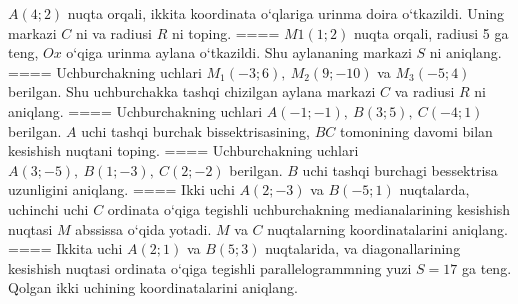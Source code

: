 \(A (4;2) \) nuqta orqali, ikkita koordinata o‘qlariga
urinma doira o‘tkazildi. Uning markazi $C$ ni va radiusi
$R$ ni toping.
====
\(M{1} (1; 2) \) nuqta orqali, radiusi 5 ga teng,
$Ox$ o‘qiga urinma aylana o‘tkazildi. Shu aylananing markazi
$S$ ni aniqlang.
====
Uchburchakning uchlari \(M_{1} (- 3;6),\ M_{2} (9; - 10) \)
va \(M_{3} (-5;4) \) berilgan. Shu uchburchakka tashqi chizilgan
aylana markazi $C$ va radiusi $R$ ni aniqlang.
====
Uchburchakning uchlari
\(A (- 1; - 1),\ B (3;5),\ C (- 4;1) \) berilgan. $A$ uchi tashqi
burchak bissektrisasining, $BC$ tomonining davomi bilan kesishish
nuqtani toping.
====
Uchburchakning uchlari
\(A (3; - 5),\ B (1; - 3),\ C (2; - 2) \) berilgan. $B$ uchi tashqi
burchagi bessektrisa uzunligini aniqlang.
====
Ikki uchi \(A (2; - 3) \) va \(B (-5;1) \) nuqtalarda,
uchinchi uchi $C$ ordinata o‘qiga tegishli uchburchakning
medianalarining kesishish nuqtasi $M$ abssissa o‘qida yotadi.
$M$ va $C$ nuqtalarning koordinatalarini aniqlang.
====
Ikkita uchi \(A (2;1) \) va \(B (5; 3) \) nuqtalarida, va
diagonallarining kesishish nuqtasi ordinata o‘qiga tegishli
parallelogrammning yuzi \(S = 17\) ga teng. Qolgan ikki uchining
koordinatalarini aniqlang.